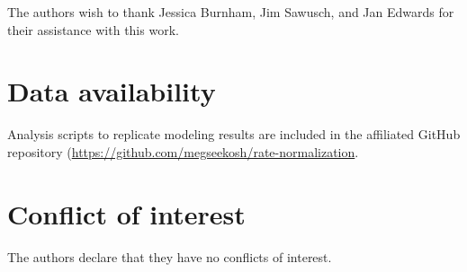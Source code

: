 \documentclass[preprint]{JASA}
\begin{document}
\begin{acknowledgements}
The authors wish to thank Jessica Burnham, Jim Sawusch, and Jan Edwards for their assistance with this work. 
\end{acknowledgements}

\section*{Data availability}
Analysis scripts to replicate modeling results are included in the affiliated GitHub repository (\url{https://github.com/megseekosh/rate-normalization}.

\section*{Conflict of interest}
The authors declare that they have no conflicts of interest.



\end{document}
